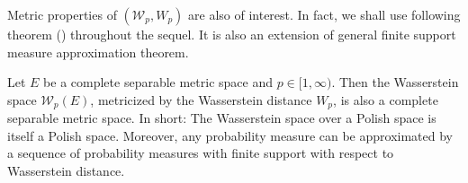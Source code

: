 Metric properties of $(\mathcal{W}_p, W_p)$ are also of interest.
In fact, we shall use following theorem (\cite[Theorem 6.18]{villani2008optimal}) throughout the sequel.
It is also an extension of general finite support measure approximation theorem.
\begin{thm}
	\label{thm:topology_Wasserstein}
	Let \( E \) be a complete separable metric space and \( p \in [ 1 , \infty ) \).
	Then the Wasserstein space \( \mathcal{W}_p(E) \),
	metricized by the Wasserstein distance \( W _ { p }\),
	is also a complete separable metric space.
	In short: The Wasserstein space over a Polish space is itself a Polish space.
	Moreover, any probability measure can be approximated by a sequence of probability measures with finite support
	with respect to Wasserstein distance.
\end{thm}

